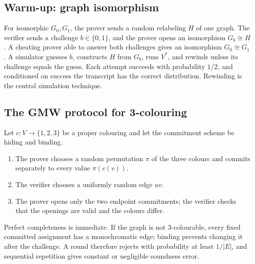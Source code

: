 \documentclass[10pt]{article}
\begin{document}
\subsection{Warm-up: graph isomorphism}

For isomorphic $G_0,G_1$, the prover sends a random relabeling $H$ of one graph.
The verifier sends a challenge $b\in\{0,1\}$, and the prover opens an isomorphism
$G_b\cong H$.  A cheating prover able to answer both challenges gives an
isomorphism $G_0\cong G_1$.  A simulator guesses $b$, constructs $H$ from $G_b$,
runs $V^*$, and rewinds unless its challenge equals the guess.  Each attempt
succeeds with probability $1/2$, and conditioned on success the transcript has
the correct distribution.  Rewinding is the central simulation technique.

\subsection{The GMW protocol for 3-colouring}

Let $c:V\to\{1,2,3\}$ be a proper colouring and let the commitment scheme be
hiding and binding.
\begin{enumerate}
\item The prover chooses a random permutation $\pi$ of the three colours and
commits separately to every value $\pi(c(v))$.
\item The verifier chooses a uniformly random edge $uv$.
\item The prover opens only the two endpoint commitments; the verifier checks
that the openings are valid and the colours differ.
\end{enumerate}
Perfect completeness is immediate.  If the graph is not 3-colourable, every
fixed committed assignment has a monochromatic edge; binding prevents changing
it after the challenge.  A round therefore rejects with probability at least
$1/|E|$, and sequential repetition gives constant or negligible soundness error.
\end{document}
